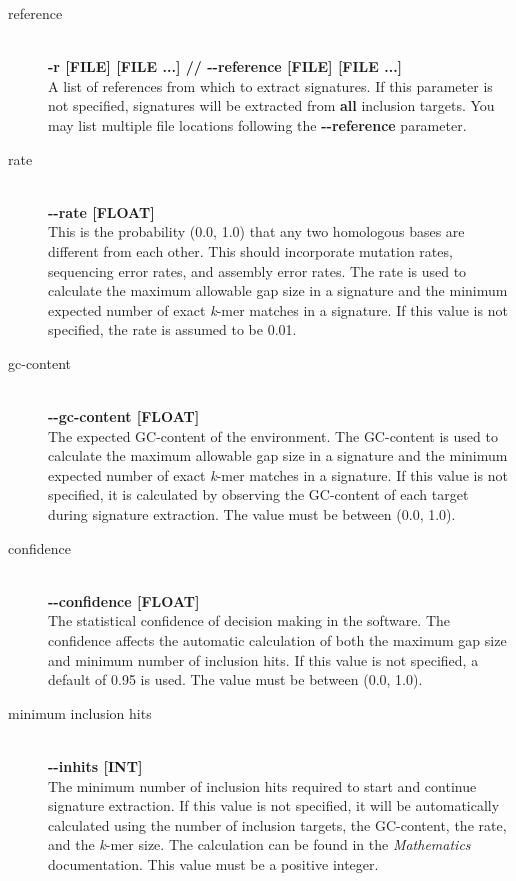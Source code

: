 \documentclass[a4paper,10pt]{article}
\begin{document}
\begin{description}

  \item[reference] \hfill \\
  \textbf{-r [FILE] [FILE ...] // -{}-reference [FILE] [FILE ...]} \hfill \\
  A list of references from which to extract signatures. If this parameter is not specified, signatures will be extracted from \textbf{all} inclusion targets. You may list multiple file locations following the \textbf{-{}-reference} parameter.
  
  \item[rate] \hfill \\
  \textbf{-{}-rate [FLOAT]} \hfill \\
  This is the probability (0.0, 1.0) that any two homologous bases are different from each other. This should incorporate mutation rates, sequencing error rates, and assembly error rates. The rate is used to calculate the maximum allowable gap size in a signature and the minimum expected number of exact \textit{k}-mer matches in a signature. If this value is not specified, the rate is assumed to be 0.01.
  
  \item[gc-content] \hfill \\
  \textbf{-{}-gc-content [FLOAT]} \hfill \\
  The expected GC-content of the environment. The GC-content is used to calculate the maximum allowable gap size in a signature and the minimum expected number of exact \textit{k}-mer matches in a signature. If this value is not specified, it is calculated by observing the GC-content of each target during signature extraction. The value must be between (0.0, 1.0).
  
  \item[confidence] \hfill \\
  \textbf{-{}-confidence [FLOAT]} \hfill \\
  The statistical confidence of decision making in the software. The confidence affects the automatic calculation of both the maximum gap size and minimum number of inclusion hits. If this value is not specified, a default of 0.95 is used. The value must be between (0.0, 1.0).
  
  \item[minimum inclusion hits] \hfill \\
  \textbf{-{}-inhits [INT]} \hfill \\
  The minimum number of inclusion hits required to start and continue signature extraction. If this value is not specified, it will be automatically calculated using the number of inclusion targets, the GC-content, the rate, and the \textit{k}-mer size. The calculation can be found in the \textit{Mathematics} documentation. This value must be a positive integer.
  

\end{description}
\end{document}
